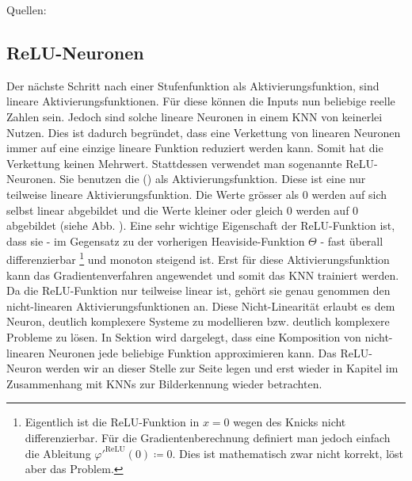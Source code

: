\para{}
Quellen: \cite{wiki:kuenstliches_neuron} \cite{wiki:perzeptron} \cite{book:hands-on}

\subsection{ReLU-Neuronen}\label{sec:ReLU}
Der nächste Schritt nach einer Stufenfunktion als Aktivierungsfunktion, sind
lineare Aktivierungsfunktionen. Für diese können die Inputs nun beliebige reelle
Zahlen sein.
Jedoch sind solche lineare Neuronen in einem KNN von keinerlei Nutzen.
Dies ist dadurch begründet, dass eine Verkettung von linearen Neuronen
immer auf eine einzige lineare Funktion reduziert werden kann. Somit hat
die Verkettung keinen Mehrwert.
\para{}
Stattdessen verwendet man sogenannte ReLU-Neuronen. Sie benutzen die
 () als Aktivierungsfunktion.
Diese ist eine
nur teilweise lineare Aktivierungsfunktion. Die Werte grösser als 0 werden
auf sich selbst linear abgebildet und die Werte kleiner oder gleich 0 werden auf 0
abgebildet (siehe Abb. ).
Eine sehr wichtige Eigenschaft der ReLU-Funktion ist, dass sie - im Gegensatz zu der vorherigen
Heaviside-Funktion $\Theta$ - fast überall differenzierbar%
\footnote{%
  Eigentlich ist die ReLU-Funktion in $x=0$ wegen des Knicks nicht
  differenzierbar. Für die Gradientenberechnung definiert man jedoch einfach
  die Ableitung $\varphi'^{\text{ReLU}}(0) \coloneqq 0$. Dies ist mathematisch zwar nicht
  korrekt, löst aber das Problem.
}%
und monoton steigend ist. Erst für diese Aktivierungsfunktion kann das Gradientenverfahren
angewendet und somit das KNN trainiert werden.
\para{}
Da die ReLU-Funktion nur teilweise linear ist, gehört sie genau genommen den
nicht-linearen Aktivierungsfunktionen an. Diese Nicht-Linearität erlaubt es dem
Neuron, deutlich komplexere Systeme zu modellieren bzw. deutlich komplexere
Probleme zu lösen. In Sektion  wird dargelegt, dass
eine Komposition von nicht-linearen Neuronen jede beliebige Funktion approximieren kann.
\para{}
Das ReLU-Neuron werden wir an dieser Stelle zur Seite legen und erst wieder in
Kapitel  im Zusammenhang mit KNNs zur Bilderkennung wieder betrachten.
\para{}
